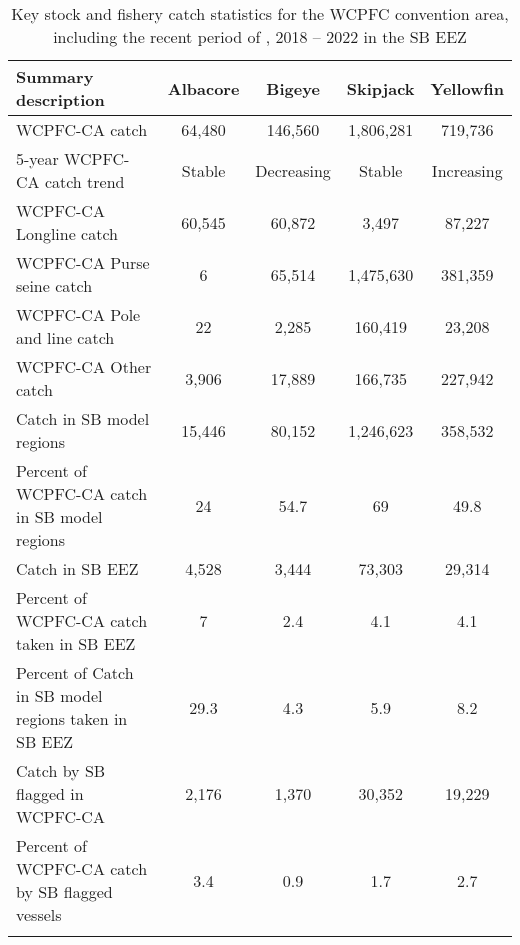 \begin{longtable}{lcccc}
\caption{Key stock and fishery catch statistics for the WCPFC convention area, including the recent period of , 2018 -- 2022 in the SB EEZ} \\ 
  \hline
Summary description & Albacore & Bigeye & Skipjack & Yellowfin \\ 
  \hline
WCPFC-CA catch & 64,480 & 146,560 & 1,806,281 & 719,736 \\ 
  5-year WCPFC-CA catch trend & Stable & Decreasing & Stable & Increasing \\ 
  WCPFC-CA Longline catch & 60,545 & 60,872 & 3,497 & 87,227 \\ 
  WCPFC-CA Purse seine catch & 6 & 65,514 & 1,475,630 & 381,359 \\ 
  WCPFC-CA Pole and line catch & 22 & 2,285 & 160,419 & 23,208 \\ 
  WCPFC-CA Other catch & 3,906 & 17,889 & 166,735 & 227,942 \\ 
  Catch in SB model regions & 15,446 & 80,152 & 1,246,623 & 358,532 \\ 
  Percent of WCPFC-CA catch in SB model regions & 24 & 54.7 & 69 & 49.8 \\ 
   \hline
Catch in SB EEZ & 4,528 & 3,444 & 73,303 & 29,314 \\ 
  Percent of WCPFC-CA catch taken in SB EEZ & 7 & 2.4 & 4.1 & 4.1 \\ 
  Percent of Catch in SB model regions taken in SB EEZ & 29.3 & 4.3 & 5.9 & 8.2 \\ 
  Catch by SB flagged in WCPFC-CA & 2,176 & 1,370 & 30,352 & 19,229 \\ 
  Percent of WCPFC-CA catch by SB flagged vessels & 3.4 & 0.9 & 1.7 & 2.7 \\ 
  \hline
\label{cat_sum_tab}
\end{longtable}
